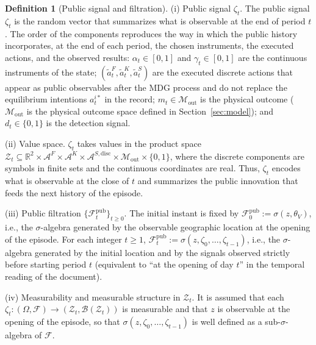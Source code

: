 \documentclass[review,authoryear,12pt]{elsarticle}
\theoremstyle{plain}
\theoremstyle{definition}
\newtheorem{definition}[theorem]{Definition}
\newcommand{\1}{\mathbf{1}}
\begin{document}
\begin{definition}[Public signal and filtration]
\label{def:zeta-filtration}
\noindent\textup{(i)} Public signal $\zeta_t$.\quad
The public signal $\zeta_t$ is the random vector that summarizes what is observable at the end of period $t$. The order of the components reproduces the way in which the public history incorporates, at the end of each period, the chosen instruments, the executed actions, and the observed results:
 $\alpha_t\in[0,1]$ and $\gamma_t\in[0,1]$ are the continuous instruments of the state; $(\tilde{a}_t^F,\tilde{a}_t^K,\tilde{a}_t^S)$ are the executed discrete actions that appear as public observables after the MDG process and do not replace the equilibrium intentions $a_t^{i\ast}$ in the record; $m_t\in\mathcal{M}_{\mathrm{out}}$ is the physical outcome \textup{(}$\mathcal{M}_{\mathrm{out}}$ is the physical outcome space defined in Section~\ref{sec:model}\textup{)}; and $d_t\in\{0,1\}$ is the detection signal.

\medskip
\noindent\textup{(ii)} Value space.\quad
$\zeta_t$ takes values in the product space $\mathcal{Z}_t \subseteq \mathbb{R}^2 \times \mathcal{A}^F \times \mathcal{A}^K \times \mathcal{A}^{S,\mathrm{disc}} \times \mathcal{M}_{\mathrm{out}} \times \{0,1\}$, where the discrete components are symbols in finite sets and the continuous coordinates are real. Thus, $\zeta_t$ encodes what is observable at the close of $t$ and summarizes the public innovation that feeds the next history of the episode.

\medskip
\noindent\textup{(iii)} Public filtration $\{\mathcal{F}_t^{\mathrm{pub}}\}_{t\ge 0}$.\quad
The initial instant is fixed by $\mathcal{F}_0^{\mathrm{pub}}:=\sigma(z, \theta_V)$, i.e., the $\sigma$-algebra generated by the observable geographic location at the opening of the episode. For each integer $t\ge 1$, $\mathcal{F}_t^{\mathrm{pub}}:=\sigma(z,\zeta_0,\ldots,\zeta_{t-1})$, i.e., the $\sigma$-algebra generated by the initial location and by the signals observed strictly before starting period $t$ \textup{(}equivalent to ``at the opening of day $t$'' in the temporal reading of the document\textup{)}.

\smallskip
\noindent\textup{(iv)} Measurability and measurable structure in $\mathcal{Z}_t$.\quad
It is assumed that each $\zeta_t:(\Omega,\mathcal{F})\to(\mathcal{Z}_t,\mathcal{B}(\mathcal{Z}_t))$ is measurable and that $z$ is observable at the opening of the episode, so that $\sigma(z,\zeta_0,\ldots,\zeta_{t-1})$ is well defined as a sub-$\sigma$-algebra of $\mathcal{F}$.
\end{definition}
\end{document}
